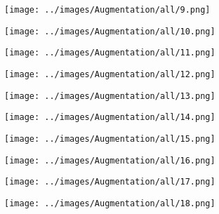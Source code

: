 \begin{figure}[H]
 \begin{subfigure}[b]{0.1\textwidth}
   \centering
   \texttt{[image: ../images/Augmentation/all/9.png]}
 \end{subfigure}
 \hspace{1em}%
 \begin{subfigure}[b]{0.1\textwidth}
   \centering
   \texttt{[image: ../images/Augmentation/all/10.png]}
 \end{subfigure}
 \hspace{1em}%
 \begin{subfigure}[b]{0.1\textwidth}
   \centering
   \texttt{[image: ../images/Augmentation/all/11.png]}
 \end{subfigure}
 \hspace{1em}%
 \begin{subfigure}[b]{0.1\textwidth}
 \centering
 \texttt{[image: ../images/Augmentation/all/12.png]}
 \end{subfigure}
 \hspace{1em}%
 \begin{subfigure}[b]{0.1\textwidth}
   \centering
   \texttt{[image: ../images/Augmentation/all/13.png]}
 \end{subfigure}
 \hspace{1em}%
 \begin{subfigure}[b]{0.1\textwidth}
   \centering
   \texttt{[image: ../images/Augmentation/all/14.png]}
 \end{subfigure}
 \hspace{1em}%
 \begin{subfigure}[b]{0.1\textwidth}
   \centering
   \texttt{[image: ../images/Augmentation/all/15.png]}
 \end{subfigure}
 \hspace{1em}%
 \begin{subfigure}[b]{0.1\textwidth}
 \centering
 \texttt{[image: ../images/Augmentation/all/16.png]}
 \end{subfigure}
 \hspace{1em}%
 \begin{subfigure}[b]{0.1\textwidth}
 \centering
 \texttt{[image: ../images/Augmentation/all/17.png]}
\end{subfigure}
\hspace{1em}%
\begin{subfigure}[b]{0.1\textwidth}
 \centering
 \texttt{[image: ../images/Augmentation/all/18.png]}

\end{subfigure}
\end{figure}
